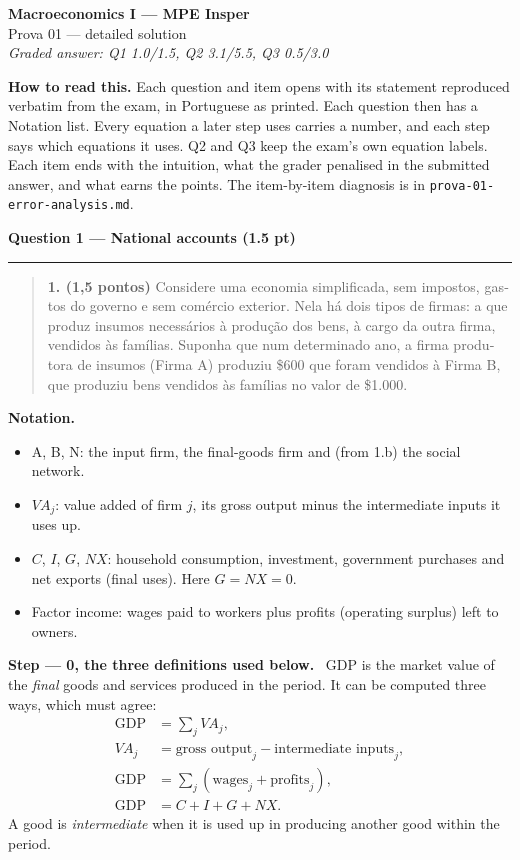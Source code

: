 \documentclass[11pt,a4paper]{article}
\newcommand{\questao}[2]{\par\bigskip\needspace{6\baselineskip}\noindent
  {\large\bfseries\color{blue!55!black}Question #1 --- #2}\par\noindent\rule{\linewidth}{0.3pt}\par}
\newcommand{\enunciado}[1]{\par\smallskip\noindent{\footnotesize\textit{Statement, as printed in the exam:}}%
  \begin{quote}\small\begin{otherlanguage}{portuguese}#1\end{otherlanguage}\end{quote}}
\newcommand{\passo}[1]{\par\smallskip\noindent\textbf{Step --- #1.}~}
\newenvironment{notacao}{\par\smallskip\noindent\textbf{Notation.}\begin{itemize}[leftmargin=1.4em,topsep=1pt,itemsep=0pt]\small}{\end{itemize}}
\begin{document}
\begin{center}
  {\Large\bfseries Macroeconomics I --- MPE Insper}\\[2pt]
  {\large Prova 01 --- detailed solution}\\[2pt]
  \textit{Graded answer: Q1 1.0/1.5, Q2 3.1/5.5, Q3 0.5/3.0}
\end{center}
{\footnotesize\noindent \textbf{How to read this.} Each question and item opens with its statement
reproduced verbatim from the exam, in Portuguese as printed. Each question then has a Notation list. Every
equation a later step uses carries a number, and each step says which equations it uses. Q2 and Q3
keep the exam's own equation labels. Each item ends with the intuition, what the grader penalised
in the submitted answer, and what earns the points. The item-by-item diagnosis is in
\texttt{prova-01-error-analysis.md}.\par}

\questao{1}{National accounts (1.5 pt)}
\enunciado{\textbf{1. (1,5 pontos)} Considere uma economia simplificada, sem impostos, gastos do governo e sem
comércio exterior. Nela há dois tipos de firmas: a que produz insumos necessários à produção dos bens,
à cargo da outra firma, vendidos às famílias. Suponha que num determinado ano, a firma produtora de
insumos (Firma A) produziu \$600 que foram vendidos à Firma B, que produziu bens vendidos às famílias
no valor de \$1.000.}

\begin{notacao}
\item A, B, N: the input firm, the final-goods firm and (from 1.b) the social network.
\item $VA_j$: value added of firm $j$, its gross output minus the intermediate inputs it uses up.
\item $C$, $I$, $G$, $NX$: household consumption, investment, government purchases and net exports
(final uses). Here $G=NX=0$.
\item Factor income: wages paid to workers plus profits (operating surplus) left to owners.
\end{notacao}

\passo{0, the three definitions used below}
GDP is the market value of the \emph{final} goods and services produced in the period. It can be
computed three ways, which must agree:
\begin{align}
\text{GDP} &= \textstyle\sum_j VA_j, \tag{G1}\label{G1}\\
VA_j &= \text{gross output}_j-\text{intermediate inputs}_j, \tag{G2}\label{G2}\\
\text{GDP} &= \textstyle\sum_j(\text{wages}_j+\text{profits}_j), \tag{G3}\label{G3}\\
\text{GDP} &= C+I+G+NX. \tag{G4}\label{G4}
\end{align}
A good is \emph{intermediate} when it is used up in producing another good within the period.
\end{document}
